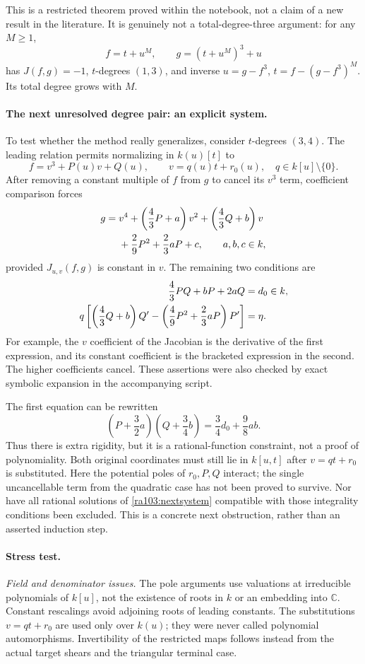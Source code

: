 \documentclass[11pt]{article}
\newcommand{\C}{\mathbb{C}}
\begin{document}
This is a restricted theorem proved within the notebook, not a claim of a
new result in the literature. It is genuinely not a total-degree-three
argument: for any $M\ge1$,
\[
 f=t+u^M,\qquad g=(t+u^M)^3+u
\]
has $J(f,g)=-1$, $t$-degrees $(1,3)$, and inverse
$u=g-f^3$, $t=f-(g-f^3)^M$. Its total degree grows with $M$.

\paragraph{The next unresolved degree pair: an explicit system.}
To test whether the method really generalizes, consider $t$-degrees $(3,4)$.
The leading relation permits normalizing in $k(u)[t]$ to
\[
 f=v^3+P(u)v+Q(u),\qquad v=q(u)t+r_0(u),\quad q\in k[u]\setminus\{0\}.
\]
After removing a constant multiple of $f$ from $g$ to cancel its $v^3$ term,
coefficient comparison forces
\begin{align}\label{ra103:quartic}
 g={}&v^4+\left(\frac43P+a\right)v^2
           +\left(\frac43Q+b\right)v\\
    &+\frac29P^2+\frac23aP+c,\notag
 \qquad a,b,c\in k,
\end{align}
provided $J_{u,v}(f,g)$ is constant in $v$. The remaining two conditions are
\begin{align}\label{ra103:nextsystem}
 \frac43PQ+bP+2aQ&=d_0\in k,\\
 q\left[\left(\frac43Q+b\right)Q'
      -\left(\frac49P^2+\frac23aP\right)P'\right]&=\eta.\notag
\end{align}
For example, the $v$ coefficient of the Jacobian is the derivative of the
first expression, and its constant coefficient is the bracketed expression
in the second. The higher coefficients cancel. These assertions were also
checked by exact symbolic expansion in the accompanying script.

The first equation can be rewritten
\[
 \left(P+\frac32a\right)\left(Q+\frac34b\right)
       =\frac34d_0+\frac98ab.
\]
Thus there is extra rigidity, but it is a rational-function constraint, not
a proof of polynomiality. Both original coordinates must still lie in
$k[u,t]$ after $v=qt+r_0$ is substituted. Here the potential poles of
$r_0,P,Q$ interact; the single uncancellable term from the quadratic case
has not been proved to survive. Nor have all rational solutions of
\eqref{ra103:nextsystem} compatible with those integrality conditions been
excluded. This is a concrete next obstruction, rather than an asserted
induction step.

\paragraph{Stress test.}
\emph{Field and denominator issues.}
The pole arguments use valuations at irreducible polynomials of $k[u]$,
not the existence of roots in $k$ or an embedding into $\C$. Constant
rescalings avoid adjoining roots of leading constants. The substitutions
$v=qt+r_0$ are used only over $k(u)$; they were never called polynomial
automorphisms. Invertibility of the restricted maps follows instead from
the actual target shears and the triangular terminal case.
\end{document}
